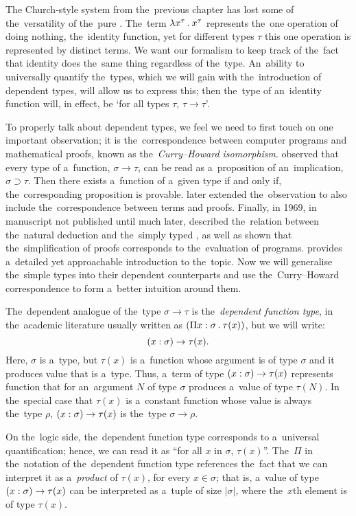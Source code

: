 
The Church-style system from the~previous chapter has lost some of
the~versatility of the~pure \lc. The~term $\lambda x^\tau \, . \: x^\tau$ represents
the~one operation of doing nothing, the~identity function, yet for different
types $\tau$ this one operation is represented by distinct terms. We want our
formalism to keep track of the~fact that identity does the~same thing regardless
of the~type. An~ability to universally quantify the~types, which we will gain
with the~introduction of dependent types, will allow us to express this; then
the~type of an~identity function will, in effect, be `for all types $\tau$,
$\tau \to \tau$'.

To properly talk about dependent types, we feel we need to first touch on one
important observation; it is the~correspondence between computer programs and
mathematical proofs, known as the~\emph{Curry–Howard isomorphism}.
\citet{curry_1934} observed that every type of a~function, $\sigma \to \tau$,
can be read as a~proposition of an~implication, $\sigma \supset \tau$. Then
there exists a~function of a~given type if and only if, the~corresponding
proposition is provable. \citet{curry_1958} later extended the~observation to
also include the~correspondence between terms and proofs. Finally, in 1969, in
manuscript not published until much later, \citet{howard_1980} described
the~relation between the~natural deduction and the~simply typed \lc, as well as
shown that the~simplification of proofs corresponds to the~evaluation of
programs. \citet{wadler_2015} provides a~detailed yet approachable introduction
to the~topic. Now we will generalise the~simple types into their dependent
counterparts and use the~Curry–Howard correspondence to form a~better intuition
around them.

The~dependent analogue of the~type $\sigma \to \tau$ is the~\emph{dependent
function type}, in the~academic literature usually written as ${(\Pi x \overset{}:
\sigma \, . \: \tau(x))}$, but we will write:
\[
  (x : \sigma) \to \tau(x).
\]
Here, $\sigma$ is a~type, but $\tau(x)$ is a~function whose argument is of type
$\sigma$ and it produces value that is a~type. Thus, a~term of type $(x : \sigma) \to \tau(x)$ represents function that for an~argument $N$ of type $\sigma$
produces a~value of type $\tau(N)$. In the~special case that $\tau(x)$ is
a~constant function whose value is always the~type $\rho$, $(x : \sigma) \to \tau(x)$ is the~type $\sigma \to \rho$.

On the~logic side, the~dependent function type corresponds to a~universal
quantification; hence, we can read it as ``for all $x$ in $\sigma$, $\tau(x)$''.
The~$\Pi$ in the~notation of the~dependent function type references the~fact
that we can interpret it as a~\emph{product} of $\tau(x)$, for every $x \in
\sigma$; that is, a~value of type $(x : \sigma) \to \tau(x)$ can be interpreted
as a~tuple of size $|\sigma|$, where the~$x$th element is of type $\tau(x)$.

